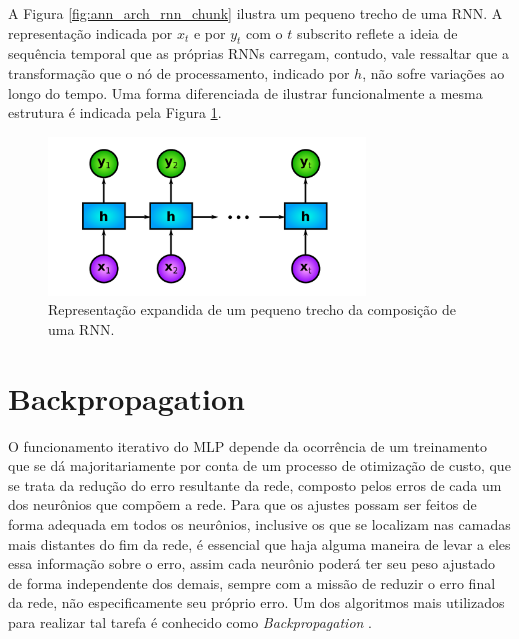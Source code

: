 A Figura \ref{fig:ann_arch_rnn_chunk} ilustra um pequeno trecho de uma RNN. A representação indicada por $x_{t}$ e por $y_{t}$ com o $t$ subscrito reflete a ideia de sequência temporal que as próprias RNNs carregam, contudo, vale ressaltar que a transformação que o nó de processamento, indicado por $h$, não sofre variações ao longo do tempo. Uma forma diferenciada de ilustrar funcionalmente a mesma estrutura é indicada pela Figura \ref{fig:ann_arch_rnn_multiple}.

\begin{figure}[H]
    \centering
    \includegraphics[width=0.75\textwidth]{figs/ann_arch_rnn_multiple.pdf}
    \caption{Representação expandida de um pequeno trecho da composição de uma RNN.}
    \label{fig:ann_arch_rnn_multiple}
\end{figure}








\section{Backpropagation}
\label{sec:ann_backpropagation}

O funcionamento iterativo do MLP depende da ocorrência de um treinamento que se dá majoritariamente por conta de um processo de otimização de custo, que se trata da redução do erro resultante da rede, composto pelos erros de cada um dos neurônios que compõem a rede. Para que os ajustes possam ser feitos de forma adequada em todos os neurônios, inclusive os que se localizam nas camadas mais distantes do fim da rede, é essencial que haja alguma maneira de levar a eles essa informação sobre o erro, assim cada neurônio poderá ter seu peso ajustado de forma independente dos demais, sempre com a missão de reduzir o erro final da rede, não especificamente seu próprio erro. Um dos algoritmos mais utilizados para realizar tal tarefa é conhecido como \textit{Backpropagation} \citep{Rumelhart1986, rumelhart1988parallel}.

